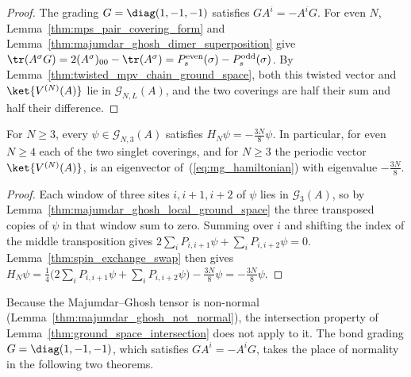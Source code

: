 \begin{proof}
    \leanok
    The grading $G=\diag(1,-1,-1)$ satisfies $GA^i=-A^iG$. For even $N$,
    Lemma~\ref{thm:mps_pair_covering_form} and
    Lemma~\ref{thm:majumdar_ghosh_dimer_superposition} give
    $\tr(A^{\sigma}G)=2(A^{\sigma})_{00}-\tr(A^{\sigma})
        =P^{\mathrm{even}}_s(\sigma)-P^{\mathrm{odd}}_s(\sigma)$.
    By Lemma~\ref{thm:twisted_mpv_chain_ground_space}, both this twisted
    vector and $\ket{V^{(N)}(A)}$ lie in $\mathcal G_{N,L}(A)$, and the two
    coverings are half their sum and half their difference.
\end{proof}

\begin{lemma}%
    \label{thm:majumdar_ghosh_hamiltonian_eigen}
    \leanok
    For $N\ge3$, every $\psi\in\mathcal G_{N,3}(A)$ satisfies
    $H_N\psi=-\tfrac{3N}{8}\psi$. In particular, for even $N\ge4$ each of the
    two singlet coverings, and for $N\ge3$ the periodic vector
    $\ket{V^{(N)}(A)}$, is an eigenvector of~(\ref{eq:mg_hamiltonian}) with
    eigenvalue $-\tfrac{3N}{8}$.
\end{lemma}

\begin{proof}
    \leanok
    Each window of three sites $i,i+1,i+2$ of $\psi$ lies in
    $\mathcal G_3(A)$, so by
    Lemma~\ref{thm:majumdar_ghosh_local_ground_space} the three transposed
    copies of $\psi$ in that window sum to zero. Summing over $i$ and shifting
    the index of the middle transposition gives
    $2\sum_iP_{i,i+1}\psi+\sum_iP_{i,i+2}\psi=0$. Lemma~\ref{thm:spin_exchange_swap}
    then gives
    $H_N\psi=\tfrac14\bigl(2\sum_iP_{i,i+1}\psi+\sum_iP_{i,i+2}\psi\bigr)
        -\tfrac{3N}{8}\psi=-\tfrac{3N}{8}\psi$.
\end{proof}

Because the Majumdar--Ghosh tensor is non-normal
(Lemma~\ref{thm:majumdar_ghosh_not_normal}), the intersection property of
Lemma~\ref{thm:ground_space_intersection} does not apply to it. The bond
grading $G=\diag(1,-1,-1)$, which satisfies $GA^i=-A^iG$, takes the place of
normality in the following two theorems.


